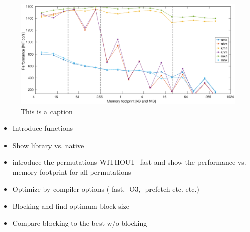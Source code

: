 \begin{figure}
\centering
\includegraphics[width = 1.1\textwidth]{fig/permGraph_fast.eps}
\caption{This is a caption}
\label{fig:comp1}
\end{figure}

\begin{itemize}
\item Introduce functions
\item Show library vs. native
\item introduce the permutations WITHOUT -fast and show the performance vs. memory footprint for all permutations
\item Optimize by compiler options (-fast, -O3, -prefetch etc. etc.)
\item Blocking and find optimum block size
\item Compare blocking to the best w/o blocking
\end{itemize}
